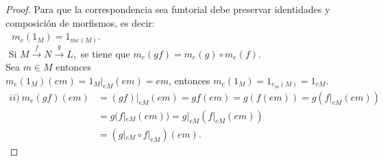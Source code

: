 \documentclass{article}
\theoremstyle{definition}
\theoremstyle{plain}
\theoremstyle{plain}
\theoremstyle{definition}
\theoremstyle{definition}
\theoremstyle{definition}
\theoremstyle{definition}
\theoremstyle{definition}
\theoremstyle{definition}
\begin{document}
\begin{enumerate}[label=\textbf{Ej \arabic*.}]
\begin{proof}
	 Para que la correspondencia sea funtorial debe preservar identidades y composición de morfismos, es decir:\\
	
	\,\, $m_e(1_M)=1_{me(M)}$.\\
	\,\,Si  $ M \stackrel{f}{\longrightarrow} N \stackrel{g}{\longrightarrow} L,$ se tiene que $m_e(gf)=m_e(g)\circ m_e(f)$.\\
	
	Sea $m\in M$ entonces\\
	
	 $m_e(1_M)(em)=1_M|_{eM}(em)=em$, entonces $m_e(1_M)=1_{e_m(M)}=1_{eM}.$
	\begin{align*}
		\boxed{ii)}\ m_e(gf)(em)&=(gf)|_{eM}(em)=gf(em)=g(f(em))=g(f|_{eM}(em))\\
		&=g(f|_{eM}(em))=g|_{eM}(f|_{eM}(em))\\
		&=(g|_{eM}\circ f|_{eM})(em).
	\end{align*}
\end{proof}


\end{enumerate}
\end{document}
